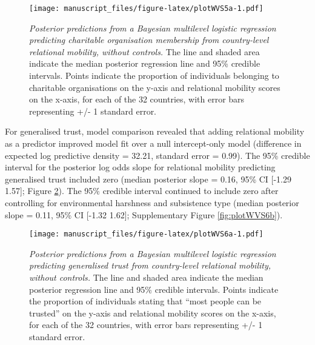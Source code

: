 \documentclass[english,man,floatsintext]{apa6}
\begin{document}
\begin{figure}
\centering
\texttt{[image: manuscript\_files/figure-latex/plotWVS5a-1.pdf]}
\caption{\label{fig:plotWVS5a}\emph{Posterior predictions from a Bayesian multilevel logistic regression predicting charitable organisation membership from country-level relational mobility, without controls.} The line and shaded area indicate the median posterior regression line and 95\% credible intervals. Points indicate the proportion of individuals belonging to charitable organisations on the y-axis and relational mobility scores on the x-axis, for each of the 32 countries, with error bars representing +/- 1 standard error.}
\end{figure}

For generalised trust, model comparison revealed that adding relational mobility as a predictor improved model fit over a null intercept-only model (difference in expected log predictive density = 32.21, standard error = 0.99). The 95\% credible interval for the posterior log odds slope for relational mobility predicting generalised trust included zero (median posterior slope = 0.16, 95\% CI {[}-1.29 1.57{]}; Figure \ref{fig:plotWVS6a}). The 95\% credible interval continued to include zero after controlling for environmental harshness and subsistence type (median posterior slope = 0.11, 95\% CI {[}-1.32 1.62{]}; Supplementary Figure \ref{fig:plotWVS6b}).



\begin{figure}
\centering
\texttt{[image: manuscript\_files/figure-latex/plotWVS6a-1.pdf]}
\caption{\label{fig:plotWVS6a}\emph{Posterior predictions from a Bayesian multilevel logistic regression predicting generalised trust from country-level relational mobility, without controls.} The line and shaded area indicate the median posterior regression line and 95\% credible intervals. Points indicate the proportion of individuals stating that \enquote{most people can be trusted} on the y-axis and relational mobility scores on the x-axis, for each of the 32 countries, with error bars representing +/- 1 standard error.}
\end{figure}
\end{document}
